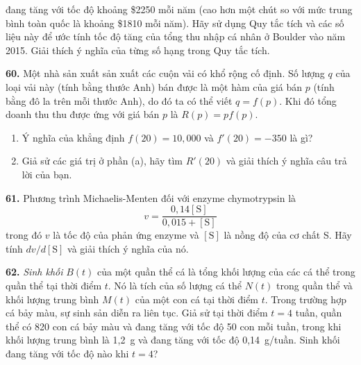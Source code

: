 \noindent
\begin{minipage}[t]{0.485\textwidth}
    \fontsize{8.5pt}{11pt}\selectfont
    đang tăng với tốc độ khoảng \$2250 mỗi năm (cao hơn một chút so với mức trung bình toàn quốc là khoảng \$1810 mỗi năm). Hãy sử dụng Quy tắc tích và các số liệu này để ước tính tốc độ tăng của tổng thu nhập cá nhân ở Boulder vào năm 2015. Giải thích ý nghĩa của từng số hạng trong Quy tắc tích.

    \vspace{0.7em}
    \textbf{60.} Một nhà sản xuất sản xuất các cuộn vải có khổ rộng cố định. Số lượng $q$ của loại vải này (tính bằng thước Anh) bán được là một hàm của giá bán $p$ (tính bằng đô la trên mỗi thước Anh), do đó ta có thể viết $q = f(p)$. Khi đó tổng doanh thu thu được ứng với giá bán $p$ là $R(p) = pf(p)$.
    \begin{enumerate}[label=\textbf{(\alph*)}, leftmargin=*, itemsep=2pt, topsep=2pt, parsep=0pt]
        \item Ý nghĩa của khẳng định $f(20) = 10{,}000$ và $f'(20) = -350$ là gì?
        \item Giả sử các giá trị ở phần (a), hãy tìm $R'(20)$ và giải thích ý nghĩa câu trả lời của bạn.
    \end{enumerate}

    \vspace{0.7em}
    \textbf{61.} Phương trình Michaelis-Menten đối với enzyme chymotrypsin là
    \[
    v = \frac{0{,}14[\text{S}]}{0{,}015 + [\text{S}]}
    \]
    trong đó $v$ là tốc độ của phản ứng enzyme và $[\text{S}]$ là nồng độ của cơ chất S. Hãy tính $dv/d[\text{S}]$ và giải thích ý nghĩa của nó.

    \vspace{0.7em}
    \textbf{62.} \textit{Sinh khối} $B(t)$ của một quần thể cá là tổng khối lượng của các cá thể trong quần thể tại thời điểm $t$. Nó là tích của số lượng cá thể $N(t)$ trong quần thể và khối lượng trung bình $M(t)$ của một con cá tại thời điểm $t$. Trong trường hợp cá bảy màu, sự sinh sản diễn ra liên tục. Giả sử tại thời điểm $t = 4$ tuần, quần thể có 820 con cá bảy màu và đang tăng với tốc độ 50 con mỗi tuần, trong khi khối lượng trung bình là 1{,}2~g và đang tăng với tốc độ 0{,}14~g/tuần. Sinh khối đang tăng với tốc độ nào khi $t = 4$?
\end{minipage}%
